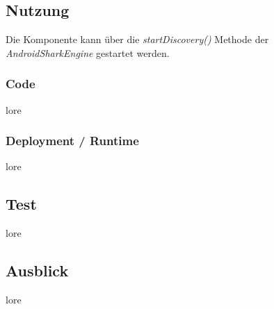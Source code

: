 \subsection{Nutzung}
Die Komponente kann über die \textit{startDiscovery()} Methode der \textit{AndroidSharkEngine} gestartet werden.

\subsubsection{Code}
lore

\subsubsection{Deployment / Runtime}
lore


\subsection{Test}
lore


\subsection{Ausblick}
lore 
\newpage